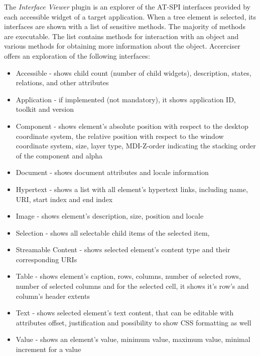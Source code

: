 The \textit{Interface Viewer} plugin is an explorer of the AT-SPI interfaces provided by each accessible widget of a target application. When a tree element is selected, its interfaces are shown with a list of sensitive methods. The majority of methods are executable. The list contains methods for interaction with an object and various methods for obtaining more information about the object. Accerciser offers an exploration of the following interfaces:
\begin{itemize}
    \item Accessible - shows child count (number of child widgets), description, states, relations, and other attributes
    \item Application - if implemented (not mandatory), it shows application ID, toolkit and version
    \item Component - shows element's absolute position with respect to the desktop coordinate system, the relative position with respect to the  window coordinate system, size, layer type, MDI-Z-order indicating the stacking order of the component and alpha
    \item Document - shows document attributes and locale information
    \item Hypertext - shows a list with all element's hypertext links,  including name, URI, start index and end index
    \item Image - shows element's description, size, position and locale
    \item Selection - shows all selectable child items of the selected item,
    \item Streamable Content - shows selected element's content type and their corresponding URIs
    \item Table - shows element's caption, rows, columns, number of selected rows, number of selected columns and for the selected cell, it shows  it's row's and column's header extents  
    \item Text - shows selected element's text content, that can be editable with attributes offset, justification  and possibility to show CSS formatting as well
    \item Value - shows an element's value, minimum value, maximum value, minimal increment for a value 
\end{itemize}

